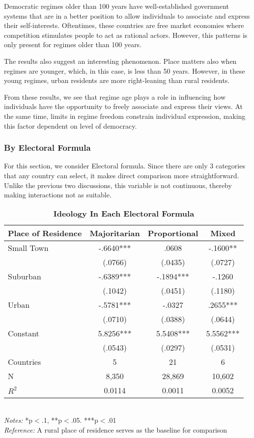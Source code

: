 \documentclass[12pt, titlepage]{article}
\newcommand\e{\emph}
\newcommand\tb{\textbf}
\begin{document}
Democratic regimes older than 100 years have well-established government systems that are in a better position to allow individuals to associate and express their self-interests. Oftentimes, these countries are free market economies where competition stimulates people to act as rational actors. However, this patterns is only present for regimes older than 100 years. 

The results also suggest an interesting phenomenon. Place matters also when regimes are younger, which, in this case, is less than 50 years. However, in these young regimes, urban residents are more right-leaning than rural residents. 

From these results, we see that regime age plays a role in influencing how individuals have the opportunity to freely associate and express their views. At the same time, limits in regime freedom constrain individual expression, making this factor dependent on level of democracy. 

\subsubsection{By Electoral Formula}

For this section, we consider Electoral formula. Since there are only 3 categories that any country can select, it makes direct comparison more straightforward. Unlike the previous two discussions, this variable is not continuous, thereby making interactions not as suitable.

\begin{table}[h!]
	\centering
	\caption{\tb{Ideology In Each Electoral Formula}}
	\begin{tabulary}{\linewidth}{l c c c}
		\\
		\hline
		\tb{Place of Residence}&\tb{Majoritarian}&\tb{Proportional} &\tb{Mixed} \\
		\hline
		Small Town&-.6640*** &.0608 &-.1600** \\
		&(.0766)&(.0435) &(.0727) \\
		Suburban&-.6389*** &-.1894***&-.1260  \\
		&(.1042) &(.0451) &(.1180) \\
		Urban&-.5781*** &-.0327 &.2655*** \\
		&(.0710) &(.0388) &(.0644) \\
		Constant& 5.8256*** &5.5408***&5.5562*** \\
		&(.0543) &(.0297) &(.0531) \\
		Countries&5&21&6 \\
		N&8,350&28,869 &10,602 \\
		$R^2$&0.0114&0.0011 &0.0052 \\
		\hline 
	\end{tabulary} 
	\\ 
	\e{Notes:} *p$<$.1, **p$<$.05. ***p$<$.01 \\
	\e{Reference:} A rural place of residence serves as the baseline for comparison
	\label{table16}
\end{table}
\end{document}
